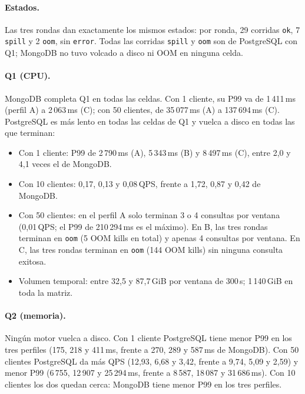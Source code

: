 \documentclass[11pt,a4paper]{article}
\newcommand{\cod}[1]{\texttt{#1}}
\begin{document}
\paragraph{Estados.} Las tres rondas dan exactamente los mismos estados: por ronda,
29 corridas \cod{ok}, 7 \cod{spill} y 2 \cod{oom}, sin \cod{error}. Todas las corridas
\cod{spill} y \cod{oom} son de PostgreSQL con Q1; MongoDB no tuvo volcado a disco ni OOM
en ninguna celda.

{\small\setlength{\tabcolsep}{3.5pt}
}

{\small\setlength{\tabcolsep}{3.5pt}
}

\paragraph{Q1 (CPU).} MongoDB completa Q1 en todas las celdas. Con 1 cliente, su P99 va de
1\,411\,ms (perfil A) a 2\,063\,ms (C); con 50 clientes, de 35\,077\,ms (A) a
137\,694\,ms (C). PostgreSQL es más lento en todas las celdas de Q1 y vuelca a disco en
todas las que terminan:
\begin{itemize}
\item Con 1 cliente: P99 de 2\,790\,ms (A), 5\,343\,ms (B) y 8\,497\,ms (C), entre 2,0 y
  4,1 veces el de MongoDB.
\item Con 10 clientes: 0,17, 0,13 y 0,08\,QPS, frente a 1,72, 0,87 y 0,42 de MongoDB.
\item Con 50 clientes: en el perfil A solo terminan 3 o 4 consultas por ventana
  (0,01\,QPS; el P99 de 210\,294\,ms es el máximo). En B, las tres rondas terminan en
  \cod{oom} (5 OOM kills en total) y apenas 4 consultas por ventana. En C, las tres rondas
  terminan en \cod{oom} (144 OOM kills) sin ninguna consulta exitosa.
\item Volumen temporal: entre 32,5 y 87,7\,GiB por ventana de 300\,s; 1\,140\,GiB en toda
  la matriz.
\end{itemize}

\paragraph{Q2 (memoria).} Ningún motor vuelca a disco. Con 1 cliente PostgreSQL tiene menor
P99 en los tres perfiles (175, 218 y 411\,ms, frente a 270, 289 y 587\,ms de MongoDB).
Con 50 clientes PostgreSQL da más QPS (12,93, 6,68 y 3,42, frente a 9,74, 5,09 y 2,59) y
menor P99 (6\,755, 12\,907 y 25\,294\,ms, frente a 8\,587, 18\,087 y 31\,686\,ms). Con 10
clientes los dos quedan cerca: MongoDB tiene menor P99 en los tres perfiles.
\end{document}
